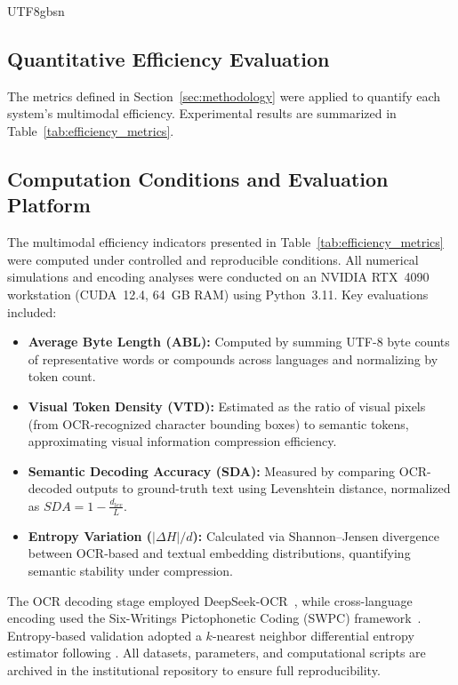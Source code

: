 \documentclass[conference]{IEEEtran}
\begin{document}
\begin{CJK*}{UTF8}{gbsn}
\subsection{Quantitative Efficiency Evaluation}

The metrics defined in Section~\ref{sec:methodology} were applied to quantify each system’s multimodal efficiency.  
Experimental results are summarized in Table~\ref{tab:efficiency_metrics}.

\subsection{Computation Conditions and Evaluation Platform}

The multimodal efficiency indicators presented in Table~\ref{tab:efficiency_metrics} were computed under controlled and reproducible conditions. All numerical simulations and encoding analyses were conducted on an NVIDIA RTX~4090 workstation (CUDA~12.4, 64~GB RAM) using Python~3.11. Key evaluations included:

\begin{itemize}
    \item \textbf{Average Byte Length (ABL):} Computed by summing UTF-8 byte counts of representative words or compounds across languages and normalizing by token count.
    \item \textbf{Visual Token Density (VTD):} Estimated as the ratio of visual pixels (from OCR-recognized character bounding boxes) to semantic tokens, approximating visual information compression efficiency.
    \item \textbf{Semantic Decoding Accuracy (SDA):} Measured by comparing OCR-decoded outputs to ground-truth text using Levenshtein distance, normalized as $SDA = 1 - \frac{d_{lev}}{L}$.
    \item \textbf{Entropy Variation ($|\Delta H|/d$):} Calculated via Shannon–Jensen divergence between OCR-based and textual embedding distributions, quantifying semantic stability under compression.
\end{itemize}

The OCR decoding stage employed DeepSeek-OCR~\cite{wei2025deepseek}, while cross-language encoding used the Six-Writings Pictophonetic Coding (SWPC) framework~\cite{weigang2024six}. Entropy-based validation adopted a $k$-nearest neighbor differential entropy estimator following \cite{belghazi2018mutual}. All datasets, parameters, and computational scripts are archived in the institutional repository to ensure full reproducibility.


\end{CJK*}
\end{document}
